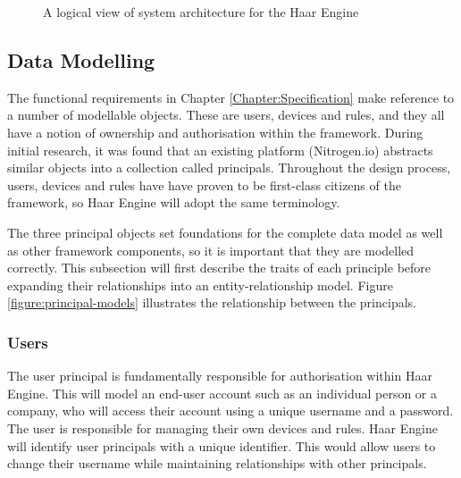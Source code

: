     \begin{figure}
    \centering
    \caption{A logical view of system architecture for the Haar Engine}\label{figure:framework-architecture}
  \end{figure}

    \subsection{Data Modelling}
      The functional requirements in Chapter \ref{Chapter:Specification} make reference to a number of modellable objects. These are users, devices and rules, and they all have a notion of ownership and authorisation within the framework. During initial research, it was found that an existing platform (Nitrogen.io) abstracts similar objects into a collection called principals. Throughout the design process, users, devices and rules have have proven to be first-class citizens of the framework, so Haar Engine will adopt the same terminology.

      The three principal objects set foundations for the complete data model as well as other framework components, so it is important that they are modelled correctly. This subsection will first describe the traits of each principle before expanding their relationships into an entity-relationship model. Figure \ref{figure:principal-models} illustrates the relationship between the principals.

      \subsubsection{Users}
        The user principal is fundamentally responsible for authorisation within Haar Engine. This will model an end-user account such as an individual person or a company, who will access their account using a unique username and a password. The user is responsible for managing their own devices and rules. Haar Engine will identify user principals with a unique identifier. This would allow users to change their username while maintaining relationships with other principals.

